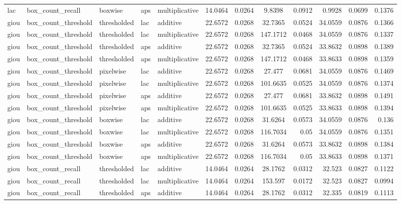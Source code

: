 \begin{table*}[htbp]
\begin{tabular}{@{}lllll rrcrrcr@{}}
lac & box\_count\_recall & boxwise & aps & multiplicative & 14.0464 & 0.0264 & 9.8398 & 0.0912 & 0.9928 & 0.0699 & 0.1376 \\
giou & box\_count\_threshold & thresholded & lac & additive & 22.6572 & 0.0268 & 32.7365 & 0.0524 & 34.0559 & 0.0876 & 0.1366 \\
giou & box\_count\_threshold & thresholded & lac & multiplicative & 22.6572 & 0.0268 & 147.1712 & 0.0468 & 34.0559 & 0.0876 & 0.1337 \\
giou & box\_count\_threshold & thresholded & aps & additive & 22.6572 & 0.0268 & 32.7365 & 0.0524 & 33.8632 & 0.0898 & 0.1389 \\
giou & box\_count\_threshold & thresholded & aps & multiplicative & 22.6572 & 0.0268 & 147.1712 & 0.0468 & 33.8633 & 0.0898 & 0.1359 \\
giou & box\_count\_threshold & pixelwise & lac & additive & 22.6572 & 0.0268 & 27.477 & 0.0681 & 34.0559 & 0.0876 & 0.1469 \\
giou & box\_count\_threshold & pixelwise & lac & multiplicative & 22.6572 & 0.0268 & 101.6635 & 0.0525 & 34.0559 & 0.0876 & 0.1374 \\
giou & box\_count\_threshold & pixelwise & aps & additive & 22.6572 & 0.0268 & 27.477 & 0.0681 & 33.8632 & 0.0898 & 0.1491 \\
giou & box\_count\_threshold & pixelwise & aps & multiplicative & 22.6572 & 0.0268 & 101.6635 & 0.0525 & 33.8633 & 0.0898 & 0.1394 \\
giou & box\_count\_threshold & boxwise & lac & additive & 22.6572 & 0.0268 & 31.6264 & 0.0573 & 34.0559 & 0.0876 & 0.136 \\
giou & box\_count\_threshold & boxwise & lac & multiplicative & 22.6572 & 0.0268 & 116.7034 & 0.05 & 34.0559 & 0.0876 & 0.1351 \\
giou & box\_count\_threshold & boxwise & aps & additive & 22.6572 & 0.0268 & 31.6264 & 0.0573 & 33.8632 & 0.0898 & 0.1384 \\
giou & box\_count\_threshold & boxwise & aps & multiplicative & 22.6572 & 0.0268 & 116.7034 & 0.05 & 33.8633 & 0.0898 & 0.1371 \\
giou & box\_count\_recall & thresholded & lac & additive & 14.0464 & 0.0264 & 28.1762 & 0.0312 & 32.523 & 0.0827 & 0.1122 \\
giou & box\_count\_recall & thresholded & lac & multiplicative & 14.0464 & 0.0264 & 153.597 & 0.0172 & 32.523 & 0.0827 & 0.0994 \\
giou & box\_count\_recall & thresholded & aps & additive & 14.0464 & 0.0264 & 28.1762 & 0.0312 & 32.335 & 0.0819 & 0.1113 \\

\end{tabular}
\end{table*}
